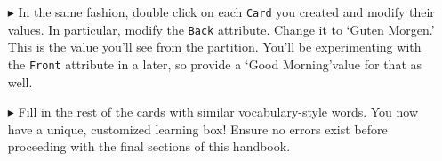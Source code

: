 \begin{itemize}
\vspace{0.5cm}

\item[$\blacktriangleright$] In the same fashion, double click on each \texttt{Card} you created and modify their values. In particular, modify the
\texttt{Back} attribute. Change it to `Guten Morgen.' This is the value you'll see from the partition. You'll be experimenting with the \texttt{Front} attribute
in a later, so provide a `Good Morning'value for that as well.

\vspace{0.5cm}

\item[$\blacktriangleright$] Fill in the rest of the cards with similar vocabulary-style words. You now have a unique, customized learning box! Ensure no errors
exist before proceeding with the final sections of this handbook.

\end{itemize}

